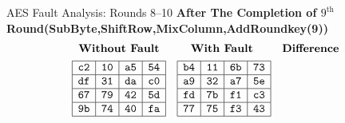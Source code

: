 \documentclass{beamer}
\newenvironment{tres important}[2][]{
	\setkeys{EmphEqEnv}{#2}
	\setkeys{EmphEqOpt}{box={\setlength{\fboxsep}{10pt}\fcolorbox{myNewColorA}{white}},#1}
	\EmphEqMainEnv}
{\endEmphEqMainEnv}
\begin{document}
\begin{frame}[fragile]{AES Fault Analysis: Rounds 8–10}
    \scriptsize
    \textbf{After The Completion of $9^{\text{th}}$ Round(SubByte,ShiftRow,MixColumn,AddRoundkey(9))}
\[
\begin{array}{ccc}
\textbf{Without Fault} & \textbf{With Fault } & \textbf{Difference } \\[1ex]
\begin{array}{|c|c|c|c|}
    \hline
    \texttt{c2} & \texttt{10} & \texttt{a5} & \texttt{54} \\
    \hline
    \texttt{df} & \texttt{31} & \texttt{da} & \texttt{c0} \\
    \hline
    \texttt{67} & \texttt{79} & \texttt{42} & \texttt{5d} \\
    \hline
    \texttt{9b} & \texttt{74} & \texttt{40} & \texttt{fa} \\
    \hline
\end{array} 
&

\begin{array}{|c|c|c|c|}
    \hline
    \texttt{b4} & \texttt{11} & \texttt{6b} & \texttt{73} \\
    \hline
    \texttt{a9} & \texttt{32} & \texttt{a7} & \texttt{5e} \\
    \hline
    \texttt{fd} & \texttt{7b} & \texttt{f1} & \texttt{c3} \\
    \hline
    \texttt{77} & \texttt{75} & \texttt{f3} & \texttt{43} \\
    \hline
    \end{array}

    &


\end{array}\]
\end{frame}
\end{document}
